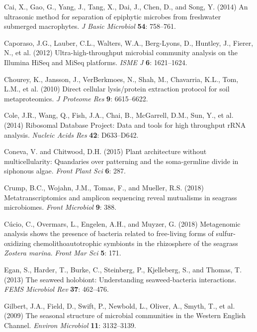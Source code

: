 \documentclass[12pt,]{article}
\begin{document}
\leavevmode\hypertarget{ref-Cai2014}{}%
Cai, X., Gao, G., Yang, J., Tang, X., Dai, J., Chen, D., and Song, Y.
(2014) An ultrasonic method for separation of epiphytic microbes from
freshwater submerged macrophytes. \emph{J Basic Microbiol} \textbf{54}:
758--761.

\leavevmode\hypertarget{ref-Caporaso2012}{}%
Caporaso, J.G., Lauber, C.L., Walters, W.A., Berg-Lyons, D., Huntley,
J., Fierer, N., et al. (2012) Ultra-high-throughput microbial community
analysis on the Illumina HiSeq and MiSeq platforms. \emph{ISME J}
\textbf{6}: 1621--1624.

\leavevmode\hypertarget{ref-Chourey2010}{}%
Chourey, K., Jansson, J., VerBerkmoes, N., Shah, M., Chavarria, K.L.,
Tom, L.M., et al. (2010) Direct cellular lysis/protein extraction
protocol for soil metaproteomics. \emph{J Proteome Res} \textbf{9}:
6615--6622.

\leavevmode\hypertarget{ref-Cole2014}{}%
Cole, J.R., Wang, Q., Fish, J.A., Chai, B., McGarrell, D.M., Sun, Y., et
al. (2014) Ribosomal Database Project: Data and tools for high
throughput rRNA analysis. \emph{Nucleic Acids Res} \textbf{42}:
D633--D642.

\leavevmode\hypertarget{ref-Coneva2015}{}%
Coneva, V. and Chitwood, D.H. (2015) Plant architecture without
multicellularity: Quandaries over patterning and the soma-germline
divide in siphonous algae. \emph{Front Plant Sci} \textbf{6}: 287.

\leavevmode\hypertarget{ref-Crump2018}{}%
Crump, B.C., Wojahn, J.M., Tomas, F., and Mueller, R.S. (2018)
Metatranscriptomics and amplicon sequencing reveal mutualisms in
seagrass microbiomes. \emph{Front Microbiol} \textbf{9}: 388.

\leavevmode\hypertarget{ref-Cucio2018}{}%
Cúcio, C., Overmars, L., Engelen, A.H., and Muyzer, G. (2018)
Metagenomic analysis shows the presence of bacteria related to
free-living forms of sulfur-oxidizing chemolithoautotrophic symbionts in
the rhizosphere of the seagrass \emph{Zostera marina}. \emph{Front Mar
Sci} \textbf{5}: 171.

\leavevmode\hypertarget{ref-Egan2013}{}%
Egan, S., Harder, T., Burke, C., Steinberg, P., Kjelleberg, S., and
Thomas, T. (2013) The seaweed holobiont: Understanding seaweed-bacteria
interactions. \emph{FEMS Microbiol Rev} \textbf{37}: 462--476.

\leavevmode\hypertarget{ref-Gilbert2009}{}%
Gilbert, J.A., Field, D., Swift, P., Newbold, L., Oliver, A., Smyth, T.,
et al. (2009) The seasonal structure of microbial communities in the
Western English Channel. \emph{Environ Microbiol} \textbf{11}:
3132--3139.
\end{document}
